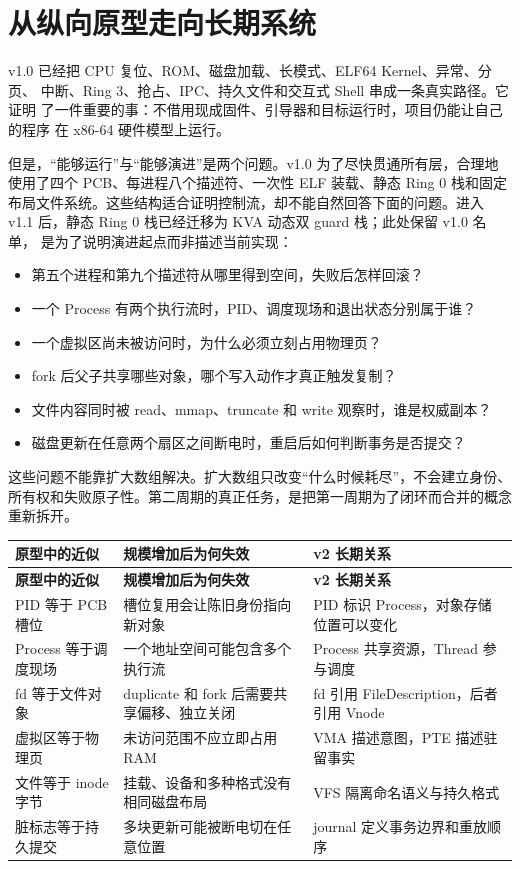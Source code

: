 \section{从纵向原型走向长期系统}

v1.0 已经把 CPU 复位、ROM、磁盘加载、长模式、ELF64 Kernel、异常、分页、
中断、Ring 3、抢占、IPC、持久文件和交互式 Shell 串成一条真实路径。它证明
了一件重要的事：不借用现成固件、引导器和目标运行时，项目仍能让自己的程序
在 x86-64 硬件模型上运行。

但是，“能够运行”与“能够演进”是两个问题。v1.0 为了尽快贯通所有层，合理地
使用了四个 PCB、每进程八个描述符、一次性 ELF 装载、静态 Ring 0 栈和固定
布局文件系统。这些结构适合证明控制流，却不能自然回答下面的问题。进入 v1.1
后，静态 Ring 0 栈已经迁移为 KVA 动态双 guard 栈；此处保留 v1.0 名单，
是为了说明演进起点而非描述当前实现：

\begin{itemize}
  \item 第五个进程和第九个描述符从哪里得到空间，失败后怎样回滚？
  \item 一个 Process 有两个执行流时，PID、调度现场和退出状态分别属于谁？
  \item 一个虚拟区尚未被访问时，为什么必须立刻占用物理页？
  \item fork 后父子共享哪些对象，哪个写入动作才真正触发复制？
  \item 文件内容同时被 read、mmap、truncate 和 write 观察时，谁是权威副本？
  \item 磁盘更新在任意两个扇区之间断电时，重启后如何判断事务是否提交？
\end{itemize}

这些问题不能靠扩大数组解决。扩大数组只改变“什么时候耗尽”，不会建立身份、
所有权和失败原子性。第二周期的真正任务，是把第一周期为了闭环而合并的概念
重新拆开。

\begin{longtable}{L{0.22\textwidth}L{0.31\textwidth}L{0.35\textwidth}}
\toprule
\textbf{原型中的近似} & \textbf{规模增加后为何失效} & \textbf{v2 长期关系}\\
\midrule
\endfirsthead
\toprule
\textbf{原型中的近似} & \textbf{规模增加后为何失效} & \textbf{v2 长期关系}\\
\midrule
\endhead
PID 等于 PCB 槽位 & 槽位复用会让陈旧身份指向新对象 & PID 标识 Process，对象存储位置可以变化\\
Process 等于调度现场 & 一个地址空间可能包含多个执行流 & Process 共享资源，Thread 参与调度\\
fd 等于文件对象 & duplicate 和 fork 后需要共享偏移、独立关闭 & fd 引用 FileDescription，后者引用 Vnode\\
虚拟区等于物理页 & 未访问范围不应立即占用 RAM & VMA 描述意图，PTE 描述驻留事实\\
文件等于 inode 字节 & 挂载、设备和多种格式没有相同磁盘布局 & VFS 隔离命名语义与持久格式\\
脏标志等于持久提交 & 多块更新可能被断电切在任意位置 & journal 定义事务边界和重放顺序\\
\bottomrule
\end{longtable}

